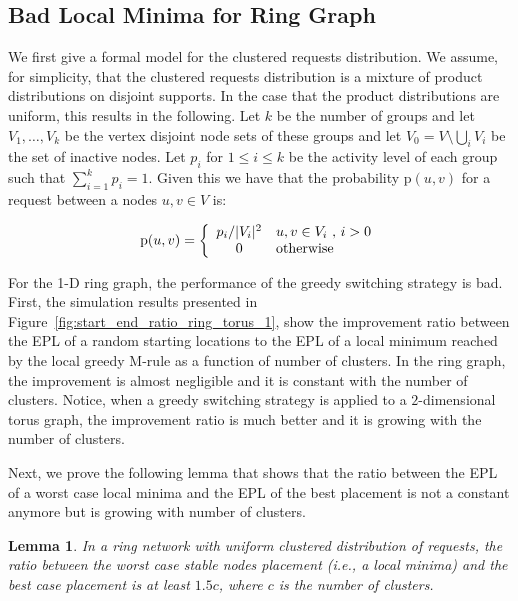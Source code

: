 \documentclass[conference]{IEEEtran}
\def\p{\mathrm{p}}
\newtheorem{lemma}{Lemma}
\begin{document}
\subsection{Bad Local Minima for Ring Graph}\label{app_ring_bad}
We first give a formal model for the clustered requests distribution.
We assume, for simplicity, that the clustered requests distribution is a mixture of product distributions on disjoint supports. In the case that the product distributions are uniform, this results in the following.
Let $k$ be the number of groups and let $V_1, \ldots, V_k$ be the vertex disjoint node sets of these groups and let $V_0 = V \setminus \bigcup_i V_i$ be the set of inactive nodes. Let $p_i$ for $1 \leq i \leq k$ be the activity level of each group such that $\sum_{i=1}^k p_i = 1$. Given this we have that the probability $\p(u,v)$ for a request between a nodes $u,v \in V$ is:

\begin{align}
\p(u,v) = \left\{
\begin{array}{c l}
p_i / |V_i|^2 & u,v\in V_i \text{ , }i>0\label{eq:uni_clustered_distr}\\
0 & \text{otherwise}
\end{array}
\right. 
\end{align}

For the 1-D ring graph, the performance of the greedy switching strategy is bad. 
First, the simulation results presented in Figure~\ref{fig:start_end_ratio_ring_torus_1}, show the improvement ratio between the EPL of a random starting locations to the EPL of a local minimum reached by the local greedy M-rule as a function of number of clusters. In the ring graph, the improvement is almost negligible and it is constant with the number of clusters. 
Notice, when a greedy switching strategy is applied to a $2$-dimensional torus graph, the improvement ratio is much better and it is growing with the number of clusters. 


Next, we prove the following lemma that shows that the ratio between the EPL of a worst case local minima and the EPL of the best placement is not a constant anymore but is growing with number of clusters.

\begin{lemma}\label{lemma:bad_local_ring}
In a ring network with uniform clustered distribution of requests, 
the ratio between the worst case stable nodes placement (i.e., a local minima) and the best case placement is at least $1.5c$, where $c$ is the number of clusters.
\end{lemma}
\end{document}
